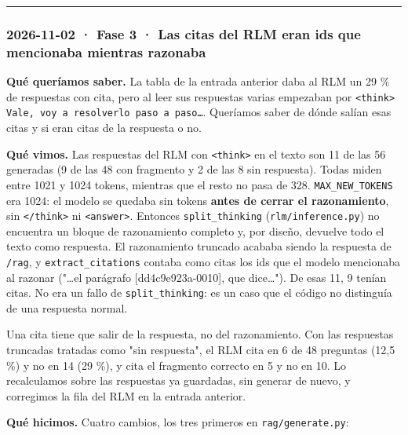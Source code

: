 \begin{center}\rule{0.5\linewidth}{0.5pt}\end{center}

\subsubsection{2026-11-02 · Fase 3 · Las citas del RLM eran ids que mencionaba mientras razonaba}

\textbf{Qué queríamos saber.} La tabla de la entrada anterior daba al RLM un 29 \% de respuestas con
cita, pero al leer sus respuestas varias empezaban por \texttt{\textless{}think\textgreater{} Vale, voy a resolverlo paso a paso…}. Queríamos saber de dónde salían esas citas y si eran citas de la respuesta o no.

\textbf{Qué vimos.} Las respuestas del RLM con \texttt{\textless{}think\textgreater{}} en el texto son 11 de las 56 generadas (9 de
las 48 con fragmento y 2 de las 8 sin respuesta). Todas miden entre 1021 y 1024 tokens, mientras que
el resto no pasa de 328. \texttt{MAX\_\allowbreak{}NEW\_\allowbreak{}TOKENS} era 1024: el modelo se quedaba sin tokens \textbf{antes de cerrar
el razonamiento}, sin \texttt{\textless{}/\allowbreak{}think\textgreater{}} ni \texttt{\textless{}answer\textgreater{}}. Entonces \texttt{split\_\allowbreak{}thinking} (\texttt{rlm/\allowbreak{}inference.py}) no
encuentra un bloque de razonamiento completo y, por diseño, devuelve todo el texto como respuesta. El
razonamiento truncado acababa siendo la respuesta de \texttt{/\allowbreak{}rag}, y \texttt{extract\_\allowbreak{}citations} contaba como
citas los ids que el modelo mencionaba al razonar ("\ldots el parágrafo {[}dd4c9e923a-0010{]}, que dice\ldots"). De
esas 11, 9 tenían citas. No era un fallo de \texttt{split\_\allowbreak{}thinking}: es un caso que el código no
distinguía de una respuesta normal.

Una cita tiene que salir de la respuesta, no del razonamiento. Con las respuestas truncadas tratadas
como "sin respuesta", el RLM cita en 6 de 48 preguntas (12,5 \%) y no en 14 (29 \%), y cita el
fragmento correcto en 5 y no en 10. Lo recalculamos sobre las respuestas ya guardadas, sin generar de
nuevo, y corregimos la fila del RLM en la entrada anterior.

\textbf{Qué hicimos.} Cuatro cambios, los tres primeros en \texttt{rag/\allowbreak{}generate.py}:

